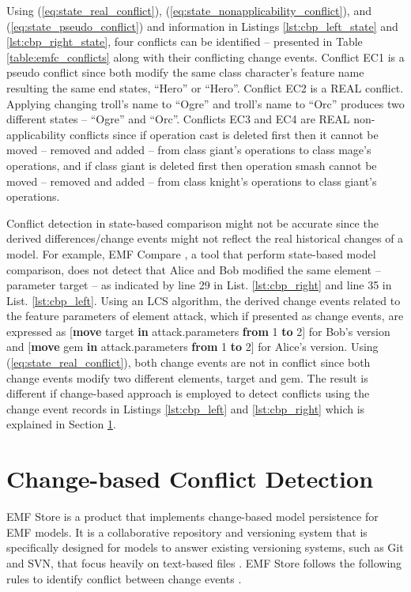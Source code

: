 Using (\ref{eq:state_real_conflict}), (\ref{eq:state_nonapplicability_conflict}), and (\ref{eq:state_pseudo_conflict}) and information in Listings \ref{lst:cbp_left_state} and \ref{lst:cbp_right_state}, four conflicts can be identified -- presented in Table \ref{table:emfc_conflicts} along with their conflicting change events. Conflict \textsf{EC1} is a \textsf{pseudo} conflict since both modify the same class \textsf{character}'s feature \textsf{name} resulting the same end states, ``Hero'' or ``Hero''. Conflict \textsf{EC2} is a \textsf{REAL} conflict. Applying changing \textsf{troll}'s \textsf{name} to ``Ogre'' and \textsf{troll}'s \textsf{name} to ``Orc'' produces two different states -- ``Ogre'' and ``Orc''. Conflicts \textsf{EC3} and \textsf{EC4} are \textsf{REAL} non-applicability conflicts since if operation \textsf{cast} is deleted first then it cannot be moved -- removed and added -- from class \textsf{giant}'s \textsf{operations} to class \textsf{mage}'s \textsf{operations}, and if class \textsf{giant} is deleted first then operation \textsf{smash} cannot be moved -- removed and added -- from  class \textsf{knight}'s \textsf{operations} to class \textsf{giant}'s \textsf{operations}.

Conflict detection in state-based comparison might not be accurate since the derived differences/change events might not reflect the real historical changes of a model. For example, EMF Compare \cite{emfcompare2018developer}, a tool that perform state-based model comparison, does not detect that Alice and Bob modified the same element -- parameter \textsf{target} -- as indicated by line 29 in List. \ref{lst:cbp_right} and line 35 in List. \ref{lst:cbp_left}. Using an LCS algorithm, the derived change events related to the feature \textsf{parameters} of element \textsf{attack}, which if presented as change events, are expressed as [\textsf{\small \textbf{move} target \textbf{in} attack.parameters \textbf{from} 1 \textbf{to} 2}] for Bob's version and [\textsf{\small \textbf{move} gem \textbf{in} attack.parameters \textbf{from} 1 \textbf{to} 2}] for Alice's version. Using (\ref{eq:state_real_conflict}), both change events are not in conflict since both change events modify two different elements, \textsf{target} and \textsf{gem}. The result is different if change-based approach is employed to detect conflicts using the change event records in Listings \ref{lst:cbp_left} and \ref{lst:cbp_right} which is explained in Section \ref{sec:emfstore_conflict_detection}.

\section{Change-based Conflict Detection}
\label{sec:emfstore_conflict_detection}
EMF Store \cite{koegel2010emfstore} is a product that implements change-based model persistence for EMF models. It is a collaborative repository and versioning system that is specifically designed for models to answer existing versioning systems, such as Git and SVN, that focus heavily on text-based files \cite{emfstore2019what}. EMF Store follows the following rules to identify conflict between change events \cite{koegel2010operation}. 

